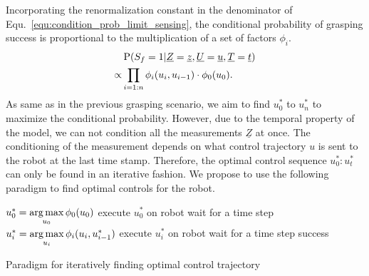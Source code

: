 Incorporating the renormalization constant in the denominator of Equ.~\ref{equ:condition_prob_limit_sensing}, the conditional probability of grasping success is proportional to the multiplication of a set of factors $\phi_i$.    
\begin{equation}
\begin{split}
&  \operatorname*{\text{P}}(S_f=1| \underline{Z} = \underline{z},  \underline{U} = \underline{u}, \underline{T} = \underline{t}) \\
\propto & \prod\limits_{i = 1:n} \phi_i(u_i, u_{i-1}) \cdot \phi_0(u_0).
\end{split}
\end{equation}
As same as in the previous grasping scenario, we aim to find $u_0^*$ to $u_n^*$ to maximize the conditional probability. However, due to the temporal property of the model, we can not condition all the measurements $\underline{Z}$ at once. The conditioning of the measurement depends on what control trajectory $u$ is sent to the robot at the last time stamp. Therefore, the optimal control sequence  $u_0^*:u_t^*$ can only be found in an iterative fashion. We propose to use the following paradigm to find optimal controls for the robot. 
\begin{algorithm}[!htbp]
\begin{algorithmic}[1]
\STATE $u_0^*  = \operatorname*{arg\,max}\limits_{u_0}  \phi_0(u_0)   $
\STATE execute $u_0^*$ on robot 
\STATE wait for a time step
\STATE $u_i^*  = \operatorname*{arg\,max}\limits_{u_i}  \phi_i(u_i ,u_{i-1}^* ) $ 
\STATE execute $u_i^*$ on robot 
\STATE wait for a time step 
\RETURN success
\ENDIF
\ENDFOR 
\caption {Paradigm for iteratively finding optimal control trajectory}
\label{paradigmforgrasping}
\end{algorithmic}
\end{algorithm}

